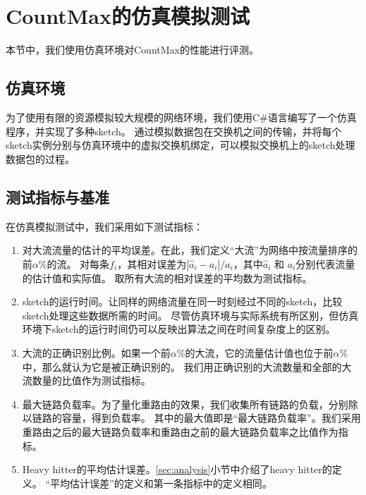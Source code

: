 \section{CountMax的仿真模拟测试}\label{sec:simulation}
本节中，我们使用仿真环境对CountMax的性能进行评测。

\subsection{仿真环境}
为了使用有限的资源模拟较大规模的网络环境，我们使用C\#语言编写了一个仿真程序，并实现了多种sketch。
通过模拟数据包在交换机之间的传输，并将每个sketch实例分别与仿真环境中的虚拟交换机绑定，可以模拟交换机上的sketch处理数据包的过程。


\subsection{测试指标与基准}\label{subsec:metric}
在仿真模拟测试中，我们采用如下测试指标：
\begin{enumerate}
	\item
    对大流流量的估计的平均误差。在此，我们定义“大流”为网络中按流量排序的前$\alpha$\%的流。
    对每条$f_i$，其相对误差为$|\hat{a}_i-a_i|/a_i$，其中$\hat{a}_i$ 和 $a_i$分别代表流量的估计值和实际值。
    取所有大流的相对误差的平均数为测试指标。
	\item
	sketch的运行时间。让同样的网络流量在同一时刻经过不同的sketch，比较sketch处理这些数据所需的时间。
	尽管仿真环境与实际系统有所区别，但仿真环境下sketch的运行时间仍可以反映出算法之间在时间复杂度上的区别。
	\item
	大流的正确识别比例。如果一个前$\alpha$\%的大流，它的流量估计值也位于前$\alpha$\%中，那么就认为它是被正确识别的。
	我们用正确识别的大流数量和全部的大流数量的比值作为测试指标。
	\item
	最大链路负载率。为了量化重路由的效果，我们收集所有链路的负载，分别除以链路的容量，得到负载率。
	其中的最大值即是“最大链路负载率”。我们采用重路由之后的最大链路负载率和重路由之前的最大链路负载率之比值作为指标。
	\item
	Heavy hitter的平均估计误差。\ref{sec:analysis}小节中介绍了heavy hitter的定义。
	“平均估计误差”的定义和第一条指标中的定义相同。
\end{enumerate}

